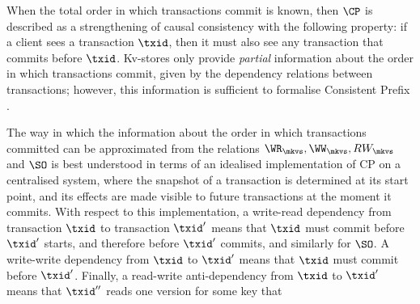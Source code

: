 \label{para:cp}
When the total order in which transactions commit is known, then 
$\CP$ is described as a strengthening of causal consistency with the following property: 
if a client sees a transaction $\txid$,
then it must also see any transaction that commits before $\txid$. 
Kv-stores only provide {\em partial} information about the order in which transactions commit, 
given by the dependency relations between transactions; however, 
this information is sufficient to formalise Consistent Prefix \cite{laws}.

The way in which the information about the order in which transactions 
committed can be approximated from the relations $\WR_{\mkvs}, \WW_{\mkvs}, 
RW_{\mkvs}$ and $\SO$ is best understood in terms of an idealised implementation of 
CP on a centralised system, 
where the snapshot of a transaction is determined at its start point, and its effects are made visible 
to future transactions at the moment it commits. 
With respect to this implementation, a write-read dependency from transaction $\txid$ to transaction $\txid'$ 
means that 
$\txid$ {must} commit before $\txid'$ starts, and therefore before $\txid'$ commits,
and similarly for $\SO$.
% 
A write-write dependency from $\txid$ to $\txid'$ means that $\txid$ {must} commit before $\txid'$. 
Finally, a read-write anti-dependency from $\txid$ to $\txid'$ 
means that $\txid''$ reads one version for some key that 
